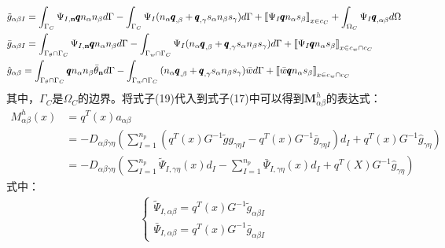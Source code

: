 \documentclass[a4paper]{article}
\begin{document}
\begin{equation}
\begin{split}
    &{\tilde g}_{\alpha\beta I} = \int_{{\Gamma _C}}^{}{{\Psi _{I,{\bf{n}}}}{\pmb{q}}{n_\alpha }{n_\beta }d\Gamma }-\int_{{\Gamma _C}}^{}{{\Psi _I}({n_\alpha }{{\pmb{q}}_{,\beta }} + {{\pmb{q}}_{,\gamma }}{s_\alpha}{n_\beta }{s_\gamma})d\Gamma }  + {\left[\kern-0.15em\left[ {{\Psi _I}{\pmb{q}}{n_\alpha }{s_\beta }} 
     \right]\kern-0.15em\right]_{{{x}} \in {c_C}}} + \int_{{\Omega _C}}^{} {{\Psi _I}{{\pmb{q}}_{,\alpha \beta }}d\Omega } \\
    &{\bar g}_{\alpha \beta I} = \int_{{\Gamma _\theta } \cap {\Gamma _C}}^{} {{\Psi _{I,{\bf{n}}}}{\pmb{q}}{n_\alpha }{n_\beta }d\Gamma }  - \int_{{\Gamma _w} \cap {\Gamma _C}}^{} {{\Psi _I}({n_\alpha }{{\pmb{q}}_{,\beta }} + {{\pmb{q}}_{,\gamma }}{s_\alpha }{n_\beta }{s_\gamma })d\Gamma }  + {\left[\kern-0.15em\left[ {{\Psi _I}{\pmb{q}}{n_\alpha }{s_\beta }} 
     \right]\kern-0.15em\right]_{{{x}} \in {c_w} \cap {c_C}}}\\
    &\hat{g}_{\alpha \beta }= \int_{{\Gamma _\theta } \cap {\Gamma _C}}^{} {{\pmb{q}}{n_\alpha }{n_\beta }{{\bar \theta }_{\bf{n}}}d\Gamma }  - \int_{{\Gamma _w} \cap {\Gamma _C}}^{} {({n_\alpha }{{\pmb{q}}_{,\beta }} + {{\pmb{q}}_{,\gamma }}{s_\alpha }{n_\beta }{s_\gamma })\bar wd\Gamma }  + {\left[\kern-0.15em\left[ {\bar w{\pmb{q}}{n_\alpha }{s_\beta }} 
     \right]\kern-0.15em\right]_{{{x}} \in {c_w} \cap {c_C}}}
\end{split}
\end{equation}
其中，$\Gamma_C$是$\Omega_C$的边界。将式子(19)代入到式子(17)中可以得到$\pmb{M}^h_{\alpha\beta}$的表达式：
\begin{equation}
\begin{split}
M_{\alpha\beta}^h(x)&=q^T(x)a_{\alpha\beta}\\
&=-D_{\alpha\beta\gamma\eta}(\sum_{I=1}^{n_p}(q^T(x)G^{-1}\tilde{g}g_{\gamma\eta I}-q^T(x)G^{-1}\bar{g}_{\gamma\eta I})d_I+q^T(x)G^{-1}\hat{g}_{\gamma\eta})\\
&=-D_{\alpha\beta\gamma\eta}(\sum_{I=1}^{n_p}\tilde{\Psi}_{I,\gamma\eta}(x)d_I-\sum_{I=1}^{n_p}\bar{\Psi}_{I,\gamma\eta}(x)d_I+q^T(X)G^{-1}\hat{g}_{\gamma\eta})
\end{split}
\end{equation}
式中：
\begin{equation}
\begin{split}
\begin{cases}
    \tilde{\Psi}_{I,\alpha\beta}=q^T(x)G^{-1}\tilde{g}_{\alpha\beta I}\\
    \bar{\Psi}_{I,\alpha\beta}=q^T(x)G^{-1}\bar{g}_{\alpha\beta I}
\end{cases}
\end{split}
\end{equation}\par
\end{document}
